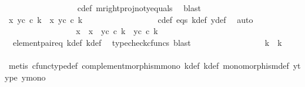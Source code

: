 \begin{isabellebody}
\ \ \ \ \ \ \ \ \ \ \ \ \ \ \ \ \isamarkupfalse%
\ c{\isacharunderscore}{\kern0pt}def\ m{\isacharunderscore}{\kern0pt}rightproj{\isacharunderscore}{\kern0pt}not{\isacharunderscore}{\kern0pt}y{}{\isacharunderscore}{\kern0pt}equals\ \isamarkupfalse%
\ blast\isanewline
\ \ \ \ \ \ \ \ \ \ \ \ \ \ \isamarkupfalse%
\ \isamarkupfalse%
\ {\isachardoublequoteopen}{\isasymlangle}x{}{\isacharcomma}{\kern0pt}\ y{}\isactrlsup c\ {\isasymcirc}\isactrlsub c\ k{\isacharprime}{\kern0pt}{\isasymrangle}\ {\isacharequal}{\kern0pt}\ {\isasymlangle}x{}{\isacharcomma}{\kern0pt}\ y{}\isactrlsup c\ {\isasymcirc}\isactrlsub c\ k{\isasymrangle}{\isachardoublequoteclose}\isanewline
\ \ \ \ \ \ \ \ \ \ \ \ \ \ \ \ \isamarkupfalse%
\ c{\isacharunderscore}{\kern0pt}def\ eqs\ k{\isacharunderscore}{\kern0pt}def\ y{\isacharunderscore}{\kern0pt}def\ \isamarkupfalse%
\ auto\isanewline
\ \ \ \ \ \ \ \ \ \ \ \ \ \ \isamarkupfalse%
\ \isamarkupfalse%
\ {\isachardoublequoteopen}{\isacharparenleft}{\kern0pt}x{}\ {\isacharequal}{\kern0pt}\ x{}{\isacharparenright}{\kern0pt}\ {\isasymand}\ {\isacharparenleft}{\kern0pt}y{}\isactrlsup c\ {\isasymcirc}\isactrlsub c\ k{\isacharprime}{\kern0pt}\ {\isacharequal}{\kern0pt}\ y{}\isactrlsup c\ {\isasymcirc}\isactrlsub c\ k{\isacharparenright}{\kern0pt}{\isachardoublequoteclose}\isanewline
\ \ \ \ \ \ \ \ \ \ \ \ \ \ \ \ \isamarkupfalse%
\ \ element{\isacharunderscore}{\kern0pt}pair{\isacharunderscore}{\kern0pt}eq\ k{\isacharprime}{\kern0pt}{\isacharunderscore}{\kern0pt}def\ k{\isacharunderscore}{\kern0pt}def\ \isamarkupfalse%
\ {\isacharparenleft}{\kern0pt}typecheck{\isacharunderscore}{\kern0pt}cfuncs{\isacharcomma}{\kern0pt}\ blast{\isacharparenright}{\kern0pt}\isanewline
\ \ \ \ \ \ \ \ \ \ \ \ \ \ \isamarkupfalse%
\ \isamarkupfalse%
\ {\isachardoublequoteopen}k{\isacharprime}{\kern0pt}\ {\isacharequal}{\kern0pt}\ k{\isachardoublequoteclose}\isanewline
\ \ \ \ \ \ \ \ \ \ \ \ \ \ \ \ \isamarkupfalse%
\ {\isacharparenleft}{\kern0pt}metis\ cfunc{\isacharunderscore}{\kern0pt}type{\isacharunderscore}{\kern0pt}def\ complement{\isacharunderscore}{\kern0pt}morphism{\isacharunderscore}{\kern0pt}mono\ k{\isacharprime}{\kern0pt}{\isacharunderscore}{\kern0pt}def\ k{\isacharunderscore}{\kern0pt}def\ monomorphism{\isacharunderscore}{\kern0pt}def\ y{}{\isacharprime}{\kern0pt}{\isacharunderscore}{\kern0pt}type\ y{}{\isacharunderscore}{\kern0pt}mono{\isacharparenright}{\kern0pt}\isanewline

\end{isabellebody}
